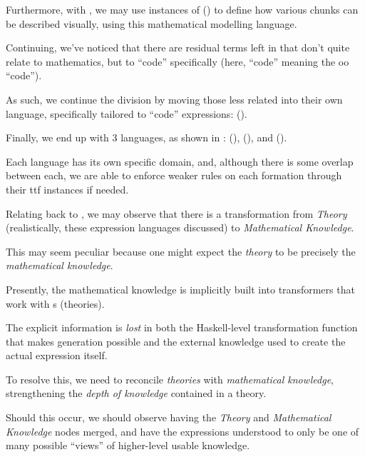 Furthermore, with \ModelExpr{}, we may use instances of \Express{}
() to define how various chunks can be described
visually, using this mathematical modelling language.

\currentExpressHaskell{}

Continuing, we've noticed that there are residual terms left in \Expr{} that
don't quite relate to mathematics, but to ``code'' specifically (here, ``code''
meaning the \acs{oo} ``code'').

As such, we continue the division by moving those less related into their own
language, specifically tailored to ``code'' expressions: \CodeExpr{} ().




Finally, we end up with 3 languages, as shown in : \Expr{}
(), \ModelExpr{} (), and
\CodeExpr{} ().

Each language has its own specific domain, and, although there is some overlap
between each, we are able to enforce weaker rules on each formation through
their \acs{ttf} instances if needed.




Relating back to , we may observe that there is a
transformation from \textit{Theory} (realistically, these expression languages
discussed) to \textit{Mathematical Knowledge}.

This may seem peculiar because one might expect the \textit{theory} to be
precisely the \textit{mathematical knowledge}.

Presently, the mathematical knowledge is implicitly built into transformers that
work with \RelationConcept{}s (theories).

The explicit information is \textit{lost} in both the Haskell-level
transformation function that makes generation possible and the external
knowledge used to create the actual expression itself.

To resolve this, we need to reconcile \textit{theories} with
\textit{mathematical knowledge}, strengthening the \textit{depth of knowledge}
contained in a theory.

Should this occur, we should observe  having the
\textit{Theory} and \textit{Mathematical Knowledge} nodes merged, and have the
expressions understood to only be one of many possible ``views'' of higher-level
usable knowledge.

